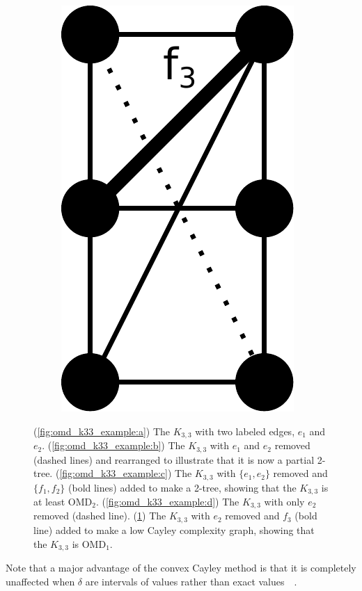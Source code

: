 \begin{figure}
\begin{subfigure}{.08\linewidth}
        \includegraphics[height=\myMinHeight]{../../img/svg/k33_omd_e}
        \caption{}\label{fig:omd_k33_example:e}
    \end{subfigure}
    \hspace{1cm}

    \caption{
    (\ref{fig:omd_k33_example:a}) The $K_{3,3}$ with two labeled edges, $e_1$ and $e_2$. (\ref{fig:omd_k33_example:b}) The $K_{3,3}$ with $e_1$ and $e_2$ removed (dashed lines) and rearranged to illustrate that it is now a partial 2-tree. (\ref{fig:omd_k33_example:c}) The $K_{3,3}$ with $\{e_1,e_2\}$ removed and $\{f_1,f_2\}$ (bold lines) added to make a 2-tree, showing that the $K_{3,3}$ is at least OMD$_2$. (\ref{fig:omd_k33_example:d}) The $K_{3,3}$ with only $e_2$ removed (dashed line). (\ref{fig:omd_k33_example:e}) The $K_{3,3}$ with $e_2$ removed and $f_3$ (bold line) added to make a low Cayley complexity graph, showing that the $K_{3,3}$ is OMD$_1$.
    }
    \label{fig:omd_k33_example}
\end{figure}

Note that a major advantage of the convex Cayley method is that it is completely unaffected when $\delta$ are intervals of values rather than exact values~~\cite{sitharam2010convex}.

